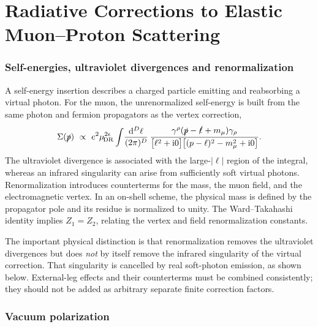 \section{Radiative Corrections to Elastic Muon--Proton Scattering}

\subsubsection{Self-energies, ultraviolet divergences and renormalization}

A self-energy insertion describes a charged particle emitting and
reabsorbing a virtual photon. For the muon, the unrenormalized self-energy is
built from the same photon and fermion propagators as the vertex correction,
\begin{equation}
 \Sigma(\slashed p)\ \propto\ e^2\mu_{\!\mathrm{DR}}^{2\epsilon}
 \int\!\frac{\mathrm d^D\ell}{(2\pi)^D}\,
 \frac{\gamma^\rho(\slashed p-\slashed\ell+m_\mu)\gamma_\rho}
 {\bigl[\ell^2+\mathrm i0\bigr]
  \bigl[(p-\ell)^2-m_\mu^2+\mathrm i0\bigr]}.
 \label{eq:nlo_self_energy}
\end{equation}
The ultraviolet divergence is associated with the large-$|\ell|$ region
of the integral, whereas an infrared singularity can arise from sufficiently
soft virtual photons. Renormalization introduces counterterms for the mass,
the muon field, and the electromagnetic vertex. In an on-shell scheme, the
physical mass is defined by the propagator pole and its residue is normalized
to unity. The Ward--Takahashi identity implies $Z_1=Z_2$, relating the vertex
and field renormalization constants.

The important physical distinction is that renormalization removes the
ultraviolet divergences but does \emph{not} by itself remove the infrared
singularity of the virtual correction. That singularity is cancelled by real
soft-photon emission, as shown below. External-leg effects and their
counterterms must be combined consistently; they should not be added as
arbitrary separate finite correction factors.

\subsubsection{Vacuum polarization}


